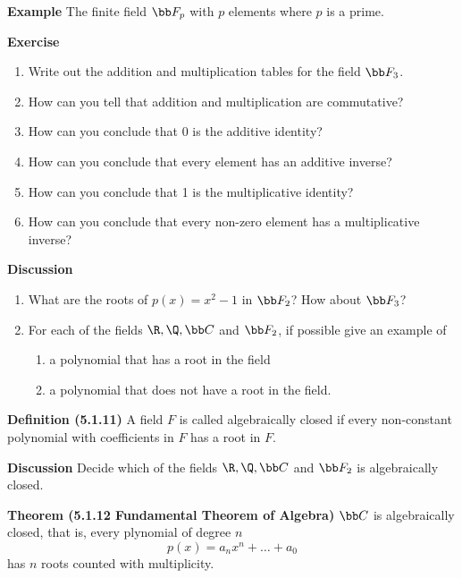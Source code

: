 \documentclass[letterpaper, 10pt]{article}
\begin{document}
\lb
\textbf{Example}
\lb
The finite field $\bb F_p$ with $p$ elements where $p$ is a prime.

\vspace{50pt}
\lb
\textbf{Exercise}
\lb
\begin{enumerate}
    \item Write out the addition and multiplication tables for the field $\bb F_3$.
    \item How can you tell that addition and multiplication are commutative?
    \item How can you conclude that $0$ is the additive identity?
    \item How can you conclude that every element has an additive inverse?
    \item How can you conclude that 1 is the multiplicative identity?
    \item How can you conclude that every non-zero element has a multiplicative inverse?
\end{enumerate}



\newpage
\lb
\textbf{Discussion}
\lb
\begin{enumerate}
    \item What are the roots of $p(x) = x^2 -1$ in $\bb F_2$? How about  $\bb F_3$?
    \item For each of the fields $\R, \Q, \bb C$ and $\bb F_2$, if possible give an example of
        \begin{enumerate}
            \item a polynomial that has a root in the field
            \item a polynomial that does not have a root in the field.
        \end{enumerate}
\end{enumerate}


\vspace{200pt}
\lb
\textbf{Definition (5.1.11)}
\lb
A field $F$ is called algebraically closed if every non-constant polynomial with coefficients in
$F$ has a root in $F$.

\vspace{20pt}
\lb
\textbf{Discussion}
\lb
Decide which of the fields $\R, \Q, \bb C$ and $\bb F_2$ is algebraically closed.



\vspace{200pt}
\lb
\textbf{Theorem (5.1.12 Fundamental Theorem of Algebra)}
\lb
$\bb C$ is algebraically closed, that is, every plynomial of degree $n$
\[ p(x) = a_n x^n + \dots + a_0 \]
has $n$ roots counted with multiplicity.
\end{document}
